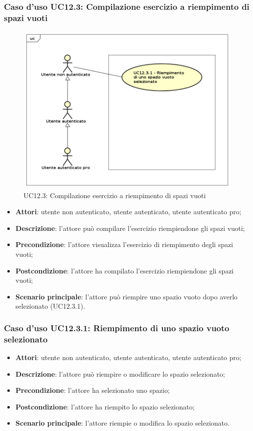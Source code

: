 \subsubsection{Caso d'uso UC12.3: Compilazione esercizio a riempimento di spazi vuoti}
\label{UC12.3}
\begin{figure}[h]
	\centering
	\includegraphics[scale=0.5]{UML/UC12_3.png}
	\caption{UC12.3: Compilazione esercizio a riempimento di spazi vuoti}
\end{figure}
\begin{itemize}
\item \textbf{Attori}: utente non autenticato, utente autenticato, utente autenticato pro;
\item \textbf{Descrizione}: l'attore può compilare l'esercizio riempiendone gli spazi vuoti;
\item \textbf{Precondizione}: l'attore visualizza l'esercizio di riempimento degli spazi vuoti;
\item \textbf{Postcondizione}: l'attore ha compilato l'esercizio riempiendone gli spazi vuoti;
\item \textbf{Scenario principale}: l'attore può riempire uno spazio vuoto dopo averlo selezionato (UC12.3.1).
\end{itemize}

\subsubsection{Caso d'uso UC12.3.1: Riempimento di uno spazio vuoto selezionato}
\begin{itemize}
\item \textbf{Attori}: utente non autenticato, utente autenticato, utente autenticato pro;
\item \textbf{Descrizione}: l'attore può riempire o modificare lo spazio selezionato;
\item \textbf{Precondizione}: l'attore ha selezionato uno spazio;
\item \textbf{Postcondizione}: l'attore ha riempito lo spazio selezionato;
\item \textbf{Scenario principale}: l'attore riempie o modifica lo spazio selezionato. 
\end{itemize}

